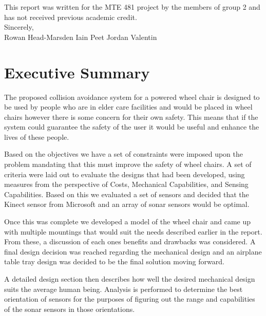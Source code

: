 \documentclass[oneside,final,a4paper]{report}
\begin{document}
This report was written for the MTE 481 project by the members of group 2 and has not received previous academic credit. \\[0.5cm]

Sincerely, \\[1cm]

Rowan Head-Marsden \hspace {1.5cm} Iain Peet \hspace{1.5cm} Jordan Valentin
\clearpage

\pagestyle{plain}
\setcounter{page}{1}

\setcounter{tocdepth}{1}
\tableofcontents

\listoffigures
{}

\chapter*{Executive Summary}
The proposed collision avoidance system for a powered wheel chair is designed to be used by people who are in elder care facilities and would be placed in wheel chairs however there is some concern for their own safety. This means that if the system could guarantee the safety of the user it would be useful and enhance the lives of these people. 

Based on the objectives we have a set of constraints were imposed upon the problem mandating that this must improve the safety of wheel chairs. A set of criteria were laid out to evaluate the designs that had been developed, using measures from the perspective of Costs, Mechanical Capabilities, and Sensing Capabilities. Based on this we evaluated a set of sensors and decided that the Kinect sensor from Microsoft and an array of sonar sensors would be optimal.

Once this was complete we developed a model of the wheel chair and came up with multiple mountings that would suit the needs described earlier in the report. From these, a discussion of each ones benefits and drawbacks was considered. A final design decision was reached regarding the mechanical design and an airplane table tray design was decided to be the final solution moving forward.

 A detailed design section then describes how well the desired mechanical design suits the average human being. Analysis is performed to determine the best orientation of sensors for the purposes of figuring out the range and capabilities of the sonar sensors in those orientations. 
\end{document}
